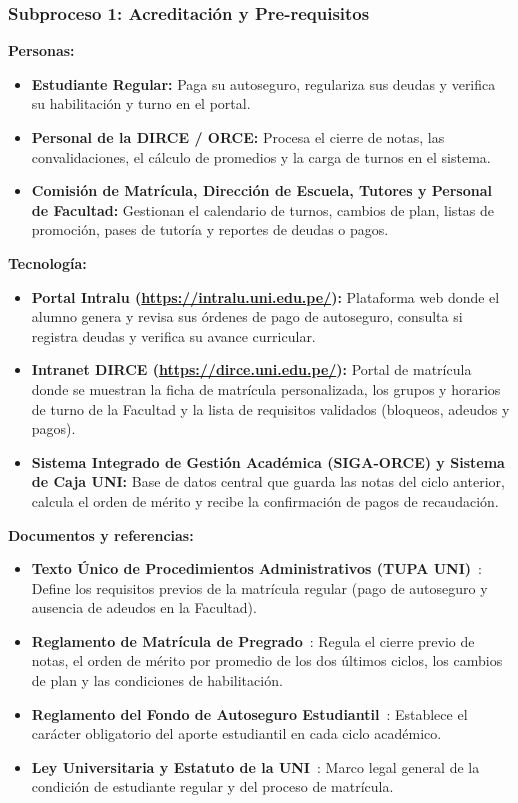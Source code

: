 \subsubsection{Subproceso 1: Acreditación y Pre-requisitos}

\textbf{Personas:}
\begin{itemize}
    \item \textbf{Estudiante Regular:} Paga su autoseguro, regulariza sus deudas y verifica su habilitación y turno en el portal.
    \item \textbf{Personal de la DIRCE / ORCE:} Procesa el cierre de notas, las convalidaciones, el cálculo de promedios y la carga de turnos en el sistema.
    \item \textbf{Comisión de Matrícula, Dirección de Escuela, Tutores y Personal de Facultad:} Gestionan el calendario de turnos, cambios de plan, listas de promoción, pases de tutoría y reportes de deudas o pagos.
\end{itemize}

\textbf{Tecnología:}
\begin{itemize}
    \item \textbf{Portal Intralu (\url{https://intralu.uni.edu.pe/}):} Plataforma web donde el alumno genera y revisa sus órdenes de pago de autoseguro, consulta si registra deudas y verifica su avance curricular.
    \item \textbf{Intranet DIRCE (\url{https://dirce.uni.edu.pe/}):} Portal de matrícula donde se muestran la ficha de matrícula personalizada, los grupos y horarios de turno de la Facultad y la lista de requisitos validados (bloqueos, adeudos y pagos).
    \item \textbf{Sistema Integrado de Gestión Académica (SIGA-ORCE) y Sistema de Caja UNI:} Base de datos central que guarda las notas del ciclo anterior, calcula el orden de mérito y recibe la confirmación de pagos de recaudación.
\end{itemize}

\textbf{Documentos y referencias:}
\begin{itemize}
    \item \textbf{Texto Único de Procedimientos Administrativos (TUPA UNI)}~\cite{tupa2024}: Define los requisitos previos de la matrícula regular (pago de autoseguro y ausencia de adeudos en la Facultad).
    \item \textbf{Reglamento de Matrícula de Pregrado}~\cite{reglamento2022}: Regula el cierre previo de notas, el orden de mérito por promedio de los dos últimos ciclos, los cambios de plan y las condiciones de habilitación.
    \item \textbf{Reglamento del Fondo de Autoseguro Estudiantil}~\cite{autoseguro2023}: Establece el carácter obligatorio del aporte estudiantil en cada ciclo académico.
    \item \textbf{Ley Universitaria y Estatuto de la UNI}~\cite{ley30220}: Marco legal general de la condición de estudiante regular y del proceso de matrícula.
\end{itemize}
